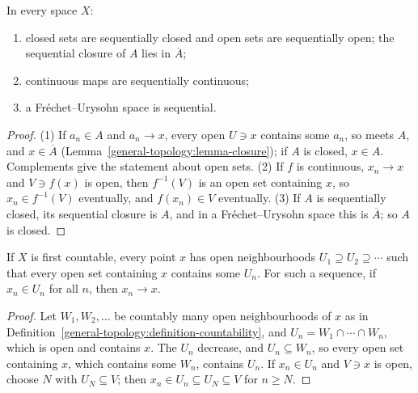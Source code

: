 \begin{lemma}\label{general-topology:lemma-sequential-basic}
In every space $X$:
\begin{enumerate}
\item closed sets are sequentially closed and open sets are sequentially open; the sequential closure of $A$ lies in $\overline{A}$;
\item continuous maps are sequentially continuous;
\item a Fr\'echet--Urysohn space is sequential.
\end{enumerate}
\end{lemma}

\begin{proof}
(1) If $a_n \in A$ and $a_n \to x$, every open $U \ni x$ contains some $a_n$, so meets $A$, and $x \in \overline{A}$ (Lemma~\ref{general-topology:lemma-closure}); if $A$ is closed, $x \in A$. Complements give the statement
about open sets. (2) If $f$ is continuous, $x_n \to x$ and $V \ni f(x)$ is open, then $f^{-1}(V)$ is an open set containing $x$, so $x_n \in f^{-1}(V)$ eventually, and $f(x_n) \in V$ eventually. (3) If $A$ is
sequentially closed, its sequential closure is $A$, and in a Fr\'echet--Urysohn space this is $\overline{A}$; so $A$ is closed.
\end{proof}

\begin{lemma}\label{general-topology:lemma-nested-basis}
If $X$ is first countable, every point $x$ has open neighbourhoods $U_1 \supseteq U_2 \supseteq \cdots$ such that every open set containing $x$ contains some $U_n$. For such a sequence, if $x_n \in U_n$ for all $n$,
then $x_n \to x$.
\end{lemma}

\begin{proof}
Let $W_1, W_2, \ldots$ be countably many open neighbourhoods of $x$ as in Definition~\ref{general-topology:definition-countability}, and $U_n = W_1 \cap \cdots \cap W_n$, which is open and contains $x$. The $U_n$ decrease, and $U_n \subseteq W_n$, so every open set containing $x$, which contains some $W_n$, contains $U_n$. If $x_n \in U_n$ and $V \ni x$ is open, choose $N$ with $U_N \subseteq V$; then
$x_n \in U_n \subseteq U_N \subseteq V$ for $n \geq N$.
\end{proof}

